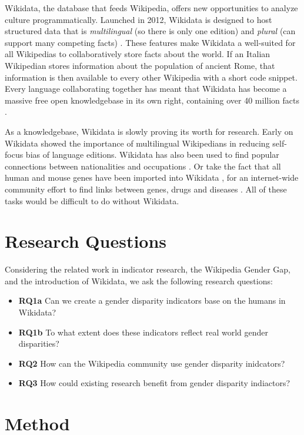 \documentclass{sig-alternate-05-2015}
\begin{document}
Wikidata, the database that feeds Wikipedia, offers new opportunities to analyze culture programmatically. Launched in 2012, Wikidata is designed to host structured data that is \textit{multilingual} (so there is only one edition) and \textit{plural} (can support many competing facts) \cite{vrandecic_wikidata:_2014}.  These features make Wikidata a well-suited for all Wikipedias to collaboratively store facts about the world. If an Italian Wikipedian stores information about the population of ancient Rome, that information is then available to every other Wikipedia with a short code snippet. Every language collaborating together has meant that Wikidata has become a massive free open knowledgebase in its own right, containing over 40 million facts \cite{krotzsch_how_????}.

As a knowledgebase, Wikidata is slowly proving its worth for research. Early on Wikidata showed the importance of multilingual Wikipedians in reducing self-focus bias of language editions. \cite{hale_multilinguals_2014} Wikidata has also been used to find popular connections between nationalities and occupations \cite{goldfarb_quantifying_2015}. Or take the fact that all human and mouse genes have been imported into Wikidata \cite{mitraka_wikidata:_2015}, for an internet-wide community effort to find links between genes, drugs and diseases \cite{burgstaller-muehlbacher_wikidata_2015}. All of these tasks would be difficult to do without Wikidata.

\section{Research Questions}
Considering the related work in indicator research, the Wikipedia Gender Gap, and the introduction of Wikidata, we ask the following research questions:
\begin{itemize}
\item\textbf{RQ1a} Can we create a gender disparity indicators base on the humans in Wikidata?
\item\textbf{RQ1b} To what extent does these indicators reflect real world gender disparities?
\item\textbf{RQ2} How can the Wikipedia community use gender disparity inidcators?
\item\textbf{RQ3} How could existing research benefit from gender disparity indiactors?
\end{itemize}

\section{Method}
\end{document}
